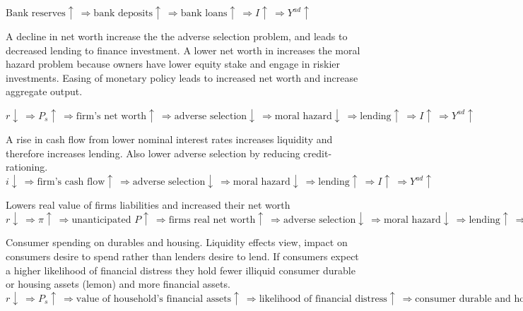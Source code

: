 \documentclass[12pt]{examnotes}
\begin{document}
$\text{Bank reserves} \uparrow \ \Rightarrow \text{bank deposits}  \uparrow \ \Rightarrow \text{bank loans} \uparrow \ \Rightarrow  I \uparrow \ \Rightarrow Y^{ad} \uparrow$ 

\vspace{6pt}
\ra A decline in net worth increase the the adverse selection problem, and leads to decreased lending to finance investment.
\ra A lower net worth in increases the moral hazard problem because owners have lower equity stake and engage in riskier investments.
\ra Easing of monetary policy leads to increased net worth and increase aggregate output.

$r \downarrow \ \Rightarrow P_s \uparrow \ \Rightarrow \text{firm's net worth} \uparrow \ \Rightarrow \text{adverse selection} \downarrow \ \Rightarrow \text{moral hazard} \downarrow \ \Rightarrow \text{lending} \uparrow \ \Rightarrow  I \uparrow \ \Rightarrow Y^{ad} \uparrow$ 


\vspace{6pt}
\ra A rise in cash flow  from lower nominal interest rates increases liquidity and therefore increases lending.
\ra Also lower adverse selection by reducing credit-rationing.
$i \downarrow \ \Rightarrow \text{firm's cash flow} \uparrow \ \Rightarrow  \text{adverse selection} \downarrow \ \Rightarrow \text{moral hazard} \downarrow \ \Rightarrow \text{lending} \uparrow \ \Rightarrow  I \uparrow \ \Rightarrow Y^{ad} \uparrow$ 


\vspace{6pt}
\ra Lowers real value of firms liabilities and increased their net worth
{\scriptsize $r \downarrow \ \Rightarrow \pi \uparrow \ \Rightarrow  \text{unanticipated }P \uparrow \ \Rightarrow \text{firms real net worth} \uparrow \ \Rightarrow \text{adverse selection} \downarrow \ \Rightarrow \text{moral hazard} \downarrow \ \Rightarrow \text{lending} \uparrow \ \Rightarrow  I \uparrow \ \Rightarrow Y^{ad} \uparrow$ }


\vspace{6pt}
\ra Consumer spending on durables and housing.
\ra Liquidity effects view, impact on consumers desire to spend rather than lenders desire to lend.
\ra If consumers expect a higher likelihood of financial distress they hold fewer illiquid consumer durable or housing assets (lemon) and more financial assets. 
{\scriptsize $r \downarrow \ \Rightarrow P_s \uparrow \ \Rightarrow  \text{value of household's financial assets} \uparrow \ \Rightarrow \text{likelihood of financial distress} \uparrow \ \Rightarrow \text{consumer durable and housing expenditure} \uparrow \ \Rightarrow Y^{ad} \uparrow$ }
\end{document}
